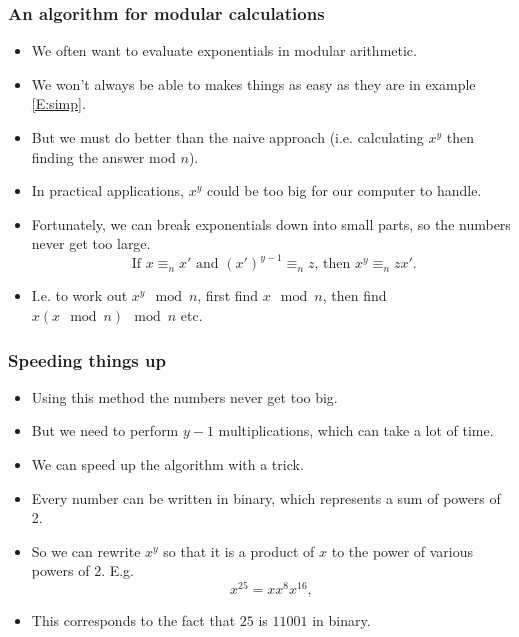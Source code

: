 \documentclass[handout]{beamer}
\begin{document}
\begin{frame}
\frametitle{An algorithm for modular calculations}
\begin{itemize}
\item We often want to evaluate exponentials in modular arithmetic. 
\vspace{0.2cm}
\item We won't always be able to makes things as easy as they are in example \ref{E:simp}.
\vspace{0.2cm}
\item But we must do better than the naive approach (i.e. calculating $x^y$ then finding the answer mod $n$). 
\vspace{0.2cm}
\item In practical applications, $x^y$ could be too big for our computer to handle. 
\vspace{0.2cm}
\item Fortunately, we can break exponentials down into small parts, so the numbers never get too large.
\[\text{ If $x\equiv_n x'$ and $(x')^{y-1} \equiv_n z$, then $x^{y} \equiv_n zx'.$}\]
\item I.e. to work out $x^y \mod n$, first find $x \mod n$, then find $x(x\mod n) \mod n$ etc.
\end{itemize}
\end{frame}

\begin{frame}
\frametitle{Speeding things up}
\begin{itemize}
\item Using this method the numbers never get too big. 
\vspace{0.2cm}
\item But we need to perform $y-1$ multiplications, which can take a lot of time. 
\vspace{0.2cm}
\item We can speed up the algorithm with a trick. 
\vspace{0.2cm}
\item Every number can be written in binary, which represents a sum of powers of 2. 
\vspace{0.2cm}
\item So we can rewrite $x^y$ so that it is a product of $x$ to the power of various powers of $2$. E.g.
\[x^{25}=xx^8x^{16},\]  
\item This corresponds to the fact that $25$ is $11001$ in binary.
\end{itemize}
\end{frame}
\end{document}
